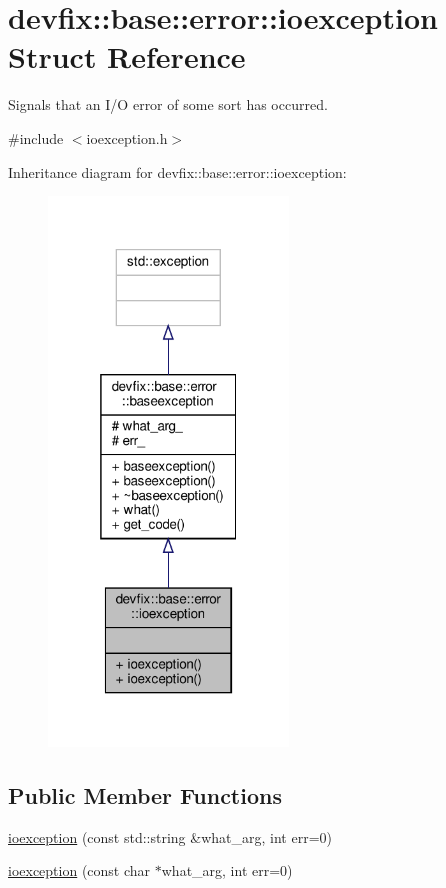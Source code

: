\hypertarget{structdevfix_1_1base_1_1error_1_1ioexception}{}\section{devfix\+:\+:base\+:\+:error\+:\+:ioexception Struct Reference}
\label{structdevfix_1_1base_1_1error_1_1ioexception}


Signals that an I/O error of some sort has occurred.  




{\ttfamily \#include $<$ioexception.\+h$>$}



Inheritance diagram for devfix\+:\+:base\+:\+:error\+:\+:ioexception\+:
\nopagebreak
\begin{figure}[H]
\begin{center}
\leavevmode
\includegraphics[width=181pt]{structdevfix_1_1base_1_1error_1_1ioexception__inherit__graph}
\end{center}
\end{figure}
\subsection*{Public Member Functions}
\begin{DoxyCompactItemize}
\item 
\hyperlink{structdevfix_1_1base_1_1error_1_1ioexception_ac44798aad44f6803e385ad36effed298}{ioexception} (const std\+::string \&what\+\_\+arg, int err=0)
\item 
\hyperlink{structdevfix_1_1base_1_1error_1_1ioexception_a2f029b0f81a5a369705cf7920cadd8cd}{ioexception} (const char $\ast$what\+\_\+arg, int err=0)
\end{DoxyCompactItemize}
